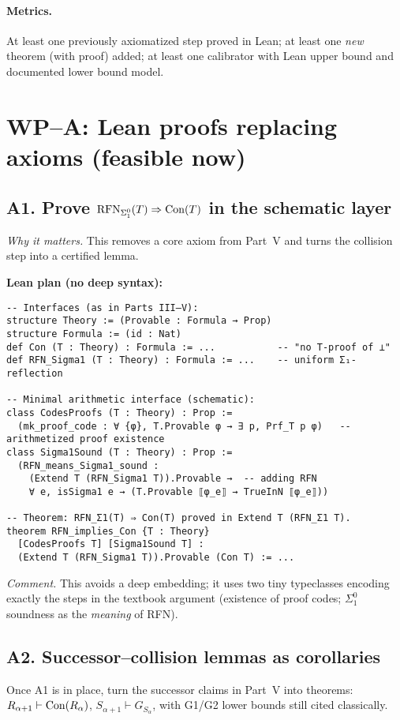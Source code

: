 \documentclass[11pt]{article}
\theoremstyle{definition}
\theoremstyle{remark}
\begin{document}
\paragraph{Metrics.}
At least one previously axiomatized step proved in Lean; at least one \emph{new} theorem (with proof) added; at least one calibrator with Lean upper bound and documented lower bound model.

\section{WP–A: Lean proofs replacing axioms (feasible now)}

\subsection{A1. Prove $\mathrm{RFN}_{\Sigma^0_1}(T)\Rightarrow \mathrm{Con}(T)$ in the schematic layer}
\emph{Why it matters.} This removes a core axiom from Part~V and turns the collision step into a certified lemma.

\medskip\noindent
\textbf{Lean plan (no deep syntax):}
\begin{verbatim}
-- Interfaces (as in Parts III–V):
structure Theory := (Provable : Formula → Prop)
structure Formula := (id : Nat)
def Con (T : Theory) : Formula := ...           -- "no T-proof of ⊥"
def RFN_Sigma1 (T : Theory) : Formula := ...    -- uniform Σ₁-reflection

-- Minimal arithmetic interface (schematic):
class CodesProofs (T : Theory) : Prop :=
  (mk_proof_code : ∀ {φ}, T.Provable φ → ∃ p, Prf_T p φ)   -- arithmetized proof existence
class Sigma1Sound (T : Theory) : Prop :=
  (RFN_means_Sigma1_sound :
    (Extend T (RFN_Sigma1 T)).Provable →  -- adding RFN
    ∀ e, isSigma1 e → (T.Provable ⟦φ_e⟧ → TrueInN ⟦φ_e⟧))

-- Theorem: RFN_Σ1(T) ⇒ Con(T) proved in Extend T (RFN_Σ1 T).
theorem RFN_implies_Con {T : Theory}
  [CodesProofs T] [Sigma1Sound T] :
  (Extend T (RFN_Sigma1 T)).Provable (Con T) := ...
\end{verbatim}

\emph{Comment.} This avoids a deep embedding; it uses two tiny typeclasses encoding exactly the steps in the textbook argument (existence of proof codes; $\Sigma^0_1$ soundness as the \emph{meaning} of RFN).

\subsection{A2. Successor–collision lemmas as corollaries}
Once A1 is in place, turn the successor claims in Part~V into theorems: 
\(
R_{\alpha+1}\vdash \mathrm{Con}(R_\alpha)\), 
\(S_{\alpha+1}\vdash G_{S_\alpha}\),
with G1/G2 lower bounds still cited classically.
\end{document}
